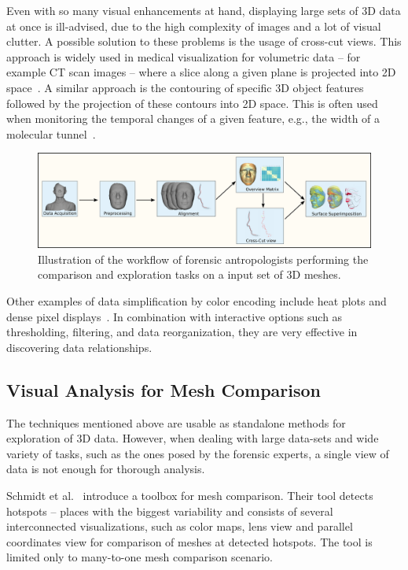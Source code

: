 \documentclass[final,5p,times]{elsarticle}
\begin{document}
Even with so many visual enhancements at hand, displaying large sets of 3D data at once is ill-advised, due to the high complexity of images and a lot of visual clutter. 
A possible solution to these problems is the usage of cross-cut views. 
This approach is widely used in medical visualization for volumetric data -- for example CT scan images -- where a slice along a given plane is projected into 2D space~\cite{friese2011yadiv}. 
A similar approach is the contouring of specific 3D object features followed by the projection of these contours into 2D space.
This is often used when monitoring the temporal changes of a given feature, e.g., the width of a molecular tunnel~\cite{byska}.

\begin{figure}[tbh]
	\centering
  \includegraphics[width=1\linewidth]{pictures/pipeline.png}
  \caption{\label{fig:pipeline1} Illustration of the workflow of forensic antropologists performing the comparison and exploration tasks on a input set of 3D meshes.}
\end{figure}

Other examples of data simplification by color encoding include heat plots and dense pixel displays~\cite{byska,ivanisiev,zhai}. 
In combination with interactive options such as thresholding, filtering, and data reorganization, they are very effective in discovering data relationships.

\subsection{Visual Analysis for Mesh Comparison}
The techniques mentioned above are usable as standalone methods for exploration of 3D data.
However, when dealing with large data-sets and wide variety of tasks, such as the ones posed by the forensic experts, a single view of data is not enough for thorough analysis.

Schmidt et al.~\cite{ymca} introduce a toolbox for mesh comparison.
Their tool detects hotspots -- places with the biggest variability and consists of several interconnected visualizations, such as color maps, lens view and parallel coordinates view for comparison of meshes at detected hotspots.
The tool is limited only to many-to-one mesh comparison scenario.
\end{document}

